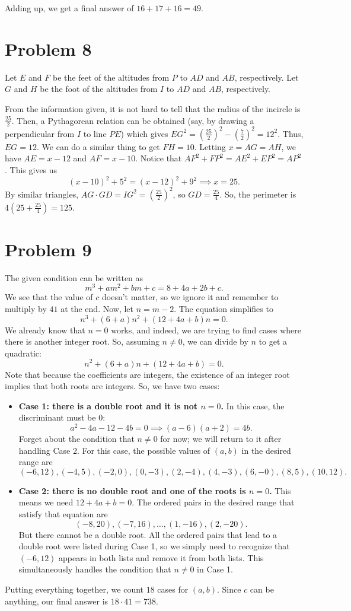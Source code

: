\documentclass{scrartcl}
\begin{document}
Adding up, we get a final answer of $16+17+16 = \boxed{49}$.
\section*{Problem 8}
Let $E$ and $F$ be the feet of the altitudes
from $P$ to $AD$ and $AB$, respectively.
Let $G$ and $H$ be the foot of the altitudes
from $I$ to $AD$ and $AB$, respectively.

From the information given, it is not hard to tell
that the radius of the incircle is $\frac{25}{2}$.
Then, a Pythagorean relation can be obtained (say, by drawing a perpendicular from $I$ to line $PE$)
which gives $EG^2 = \left( \frac{25}{2} \right)^2 - \left( \frac{7}{2} \right)^2 = 12^2$.
Thus, $EG = 12$.
We can do a similar thing to get $FH = 10$.
Letting $x = AG = AH$, we have $AE = x - 12$ and $AF = x - 10$.
Notice that $AF^2 + FP^2 = AE^2 + EP^2 = AP^2$. This gives us
\[ (x-10)^2 + 5^2 = (x-12)^2 + 9^2 \implies x = 25. \]
By similar triangles, $AG \cdot GD = IG^2 = \left( \frac{25}{2} \right)^2$,
so $GD = \frac{25}{4}$.
So, the perimeter is $4(25 + \frac{25}{4}) = \boxed{125}$.
\section*{Problem 9}
The given condition can be written as
\[ m^3 + am^2 + bm + c = 8 + 4a + 2b + c. \]
We see that the value of $c$ doesn't matter, so we ignore it and remember
to multiply by $41$ at the end.
Now, let $n = m-2$.
The equation simplifies to
\[ n^3 + (6+a)n^2 + (12 + 4a + b)n = 0. \]
We already know that $n=0$ works,
and indeed, we are trying to find cases where there is another integer root.
So, assuming $n \neq 0$, we can divide by $n$ to get a quadratic:
\[ n^2 + (6+a)n + (12 + 4a + b) = 0. \]
Note that because the coefficients are integers,
the existence of an integer root implies that both roots are integers.
So, we have two cases:

\begin{itemize}
\item \textbf{Case 1: there is a double root and it is not $n=0$.}
In this case, the discriminant must be $0$:
\[ a^2 - 4a - 12 - 4b = 0 \implies (a-6)(a+2) = 4b. \]
Forget about the condition that $n \neq 0$ for now; we will
return to it after handling Case 2.
For this case, the possible values of $(a,b)$ in the desired range are
\[ (-6,12), (-4,5), (-2,0), (0,-3), (2,-4), (4,-3), (6,-0), (8,5), (10,12). \]
\item \textbf{Case 2: there is no double root and one of the roots is $n=0$.}
This means we need $12 + 4a + b = 0$. The ordered pairs in the desired range that satisfy that equation are
\[ (-8, 20), (-7, 16), \dots, (1, -16), (2,-20). \]
But there cannot be a double root. All the ordered pairs that lead to a double root
were listed during Case 1, so we simply need to recognize that $(-6,12)$ appears in both lists
and remove it from both lists.
This simultaneously handles the condition that $n \neq 0$ in Case 1.
\end{itemize}
Putting everything together, we count $18$ cases for $(a,b)$.
Since $c$ can be anything, our final answer is $18 \cdot 41 = \boxed{738}$.
\end{document}
